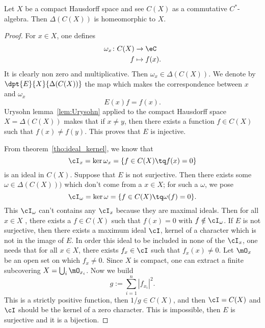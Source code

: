 \begin{proposition}     \label{PropcomCstarDelCeqX}
Let $X$ be a compact Hausdorff space and see $C(X)$ as a commutative $C^*$-algebra. Then $\Delta(C(X))$ is homeomorphic to $X$.\label{prop:comHauffhomeo}
\end{proposition}

\begin{proof}
For $x\in X$, one defines
        \begin{equation}
        \begin{aligned}
            \omega_x \colon C(X) &\to \eC\\
            f&\mapsto f(x).
        \end{aligned}
    \end{equation}
It is clearly non zero and multiplicative. Then $\omega_x\in\Delta(C(X))$. We denote by $ \dpt{E}{X}{\Delta(C(X))}$ the map which makes the correspondence between $x$ and $\omega_x$
\[
  E(x)f=f(x).
\]
Urysohn lemma~\ref{lem:Urysohn} applied to the compact Hausdorff space $X=\Delta(C(X))$ makes that if $x\neq y$, then there exists a function $f\in C(X)$ such that $f(x)\neq f(y)$. This proves that $E$ is injective.

From theorem~\ref{tho:ideal_kernel}, we know that
\[
\cI_x=\ker\omega_x=\{f\in C(X)\tq f(x)=0\}
\]
is an ideal in $C(X)$. Suppose that $E$ is not surjective. Then there exists some $\omega\in\Delta(C(X)))$ which don't come from a $x\in X$; for such a $\omega$, we pose
\[
\cI_{\omega}=\ker\omega=\{f\in C(X)\tq \omega(f)=0\}.
\]
 This $\cI_{\omega}$ can't contains any $\cI_x$ because they are maximal ideals. Then for all $x\in X$ , there exists a $f\in C(X)$ such that $f(x)=0$ with $f\notin\cI_{\omega}$. If $E$ is not surjective, then there exists a maximum ideal $\cI$, kernel of a character which is not in the image of $E$. In order this ideal to be included in none of the $\cI_x$, one needs that for all $x\in X$, there exists $f_x\in\cI$ such that $f_x(x)\neq 0$. Let $\mO_x$ be an open set on which $f_x\neq 0$. Since $X$ is compact, one can extract a finite subcovering $X=\bigcup_i\mO_{x_i}$. Now we build
\[
 g:=\sum_{i=1}^n|f_{x_i}|^2.
\]
This is a strictly positive function, then $1/g\in C(X)$, and then $\cI=C(X)$ and $\cI$ should be the kernel of a zero character. This is impossible, then $E$ is surjective and it is a bijection.


\end{proof}

